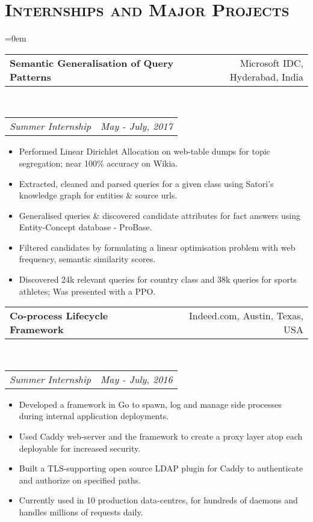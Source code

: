 \documentclass{article}
\makeatletter
\newcommand{\headerrow}[2]
{\begin{tabular*}{\linewidth}{l@{\extracolsep{\fill}}r}
	#1 &
	#2 \\
\end{tabular*}}
\newcommand{\tmpsection}[1]{}
\let\tmpsection=\section
\renewcommand{\section}[1]{\tmpsection*{\textsc{#1}}}
\makeatother
\begin{document}
\section{Internships and Major Projects}
\begin{list} {}{\leftmargin=0em}
\setlength{\leftmargin}{0pt}

\item[]
  \headerrow
    {\textbf{Semantic Generalisation of Query Patterns}}
    {Microsoft IDC, Hyderabad, India}
  \\
  \headerrow
    {\emph{Summer Internship}}
    {\emph{May - July, 2017}}
      \begin{itemize}
	\item Performed Linear Dirichlet Allocation on web-table dumps for topic segregation; near 100\% accuracy on Wikia.
        \item Extracted, cleaned and parsed queries for a given class using Satori's knowledge graph for entities \& source urls.
        \item Generalised queries \& discovered candidate attributes for fact answers using Entity-Concept database - ProBase.
        \item Filtered candidates by formulating a linear optimisation problem with web frequency, semantic similarity scores.
	  \item Discovered 24k relevant queries for country class and 38k queries for sports athletes; Was presented with a PPO.
      \end{itemize}

\item[]
  \headerrow
    {\textbf{Co-process Lifecycle Framework}}
    {Indeed.com, Austin, Texas, USA}
  \\
  \headerrow
    {\emph{Summer Internship}}
    {\emph{May - July, 2016}}
      \begin{itemize}
        \item Developed a framework in Go to spawn, log and manage side processes during internal application deployments.
        \item Used Caddy web-server and the framework to create a proxy layer atop each deployable for increased security.
        \item Built a TLS-supporting open source LDAP plugin for Caddy to authenticate and authorize on specified paths.
        \item Currently used in 10 production data-centres, for hundreds of daemons and handles millions of requests daily.
      \end{itemize}


\end{list}
\end{document}
